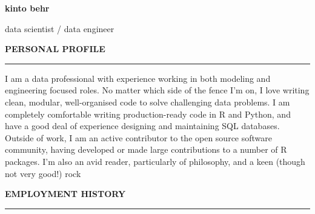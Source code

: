 \documentclass[10pt]{article}
\begin{document}
\lsstyle

\pagecolor{skyblue}

\newcommand{\stub}{\textcolor{skyblue}{\rule{3cm}{3mm}}}

\begin{huge}\begin{center}{\bf kinto behr}\end{center}\end{huge}
\begin{Large}\begin{center}{data scientist / data engineer}\end{center}\end{Large}
\vspace{1cm}

\begin{large}
{\bf PERSONAL PROFILE} \\
\textcolor{gray}{\rule{2cm}{2mm}}
\end{large}
\vspace{5pt}

\begin{small}
I am a data professional with experience working in both modeling and engineering focused roles. No matter which side of the fence I'm on, I love writing clean, modular, well-organised code to solve challenging data problems. I am completely comfortable writing production-ready code in R and Python, and have a good deal of experience designing and maintaining SQL databases.\\

Outside of work, I am an active contributor to the open source software community, having developed or made large contributions to a number of R packages. I'm also an avid reader, particularly of philosophy, and a keen (though not very good!) rock

\end{small}

\vspace{1cm}
\begin{large}
{\bf EMPLOYMENT HISTORY} \\
\textcolor{gray}{\rule{2cm}{2mm}}
\end{large}
\vspace{5pt}
\end{document}
